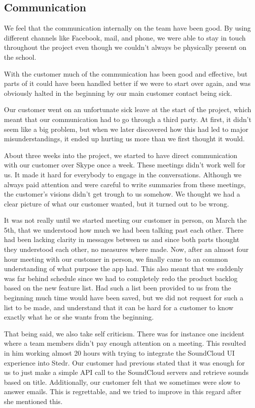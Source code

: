 	\subsection{Communication}

We feel that the communication internally on the team have been good. By using different channels like Facebook, mail, and phone, we were able to stay in touch throughout the project even though we couldn't always be physically present on the school.

With the customer much of the communication has been good and effective, but parts of it could have been handled better if we were to start over again, and was obviously halted in the beginning by our main customer contact being sick. 

Our customer went on an unfortunate sick leave at the start of the project, which meant that our communication had to go through a third party. At first, it didn't seem like a big problem, but when we later discovered how this had led to major misunderstandings, it ended up hurting us more than we first thought it would.

About three weeks into the project, we started to have direct communication with our customer over Skype once a week. These meetings didn't work well for us. It made it hard for everybody to engage in the conversations. Although we always paid attention and were careful to write summaries from these meetings, the customer's visions didn't get trough to us somehow. We thought we had a clear picture of what our customer wanted, but it turned out to be wrong.

It was not really until we started meeting our customer in person, on March the 5th, that we understood how much we had been talking past each other. There had been lacking clarity in messages between us and since both parts thought they understood each other, no measures where made. Now, after an almost four hour meeting with our customer in person, we finally came to an common understanding of what purpose the app had. This also meant that we suddenly was far behind schedule since we had to completely redo the product backlog based on the new feature list. Had such a list been provided to us from the beginning much time would have been saved, but we did not request for such a list to be made, and understand that it can be hard for a customer to know exactly what he or she wants from the beginning.

That being said, we also take self criticism. There was for instance one incident where a team members didn't pay enough attention on a meeting. This resulted in him working almost 20 hours with trying to integrate the SoundCloud UI experience into Stedr. Our customer had previous stated that it was enough for us to just make a simple API call to the SoundCloud servers and retrieve sounds based on title. Additionally, our customer felt that we sometimes were slow to answer emails. This is regrettable, and we tried to improve in this regard after she mentioned this.


